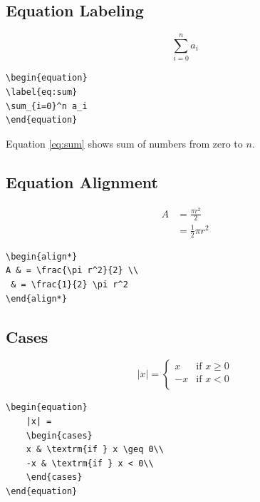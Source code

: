 \documentclass{article}
\begin{document}
\subsection{Equation Labeling}

\begin{equation}
\label{eq:sum}
\sum_{i=0}^n a_i
\end{equation}

\begin{verbatim}
\begin{equation}
\label{eq:sum}
\sum_{i=0}^n a_i
\end{equation}
\end{verbatim}

Equation \ref{eq:sum} shows sum of numbers from zero to $n$.


\subsection{Equation Alignment}

\begin{align*}
A & = \frac{\pi r^2}{2} \\
 & = \frac{1}{2} \pi r^2
\end{align*}

\begin{verbatim}
\begin{align*}
A & = \frac{\pi r^2}{2} \\
 & = \frac{1}{2} \pi r^2
\end{align*}
\end{verbatim}


\subsection{Cases}

\begin{equation}
    |x| = 
    \begin{cases}
    x & \textrm{if } x \geq 0\\
    -x & \textrm{if } x < 0\\
    \end{cases}
\end{equation}

\begin{verbatim}
\begin{equation}
    |x| = 
    \begin{cases}
    x & \textrm{if } x \geq 0\\
    -x & \textrm{if } x < 0\\
    \end{cases}
\end{equation}
\end{verbatim}
\end{document}
